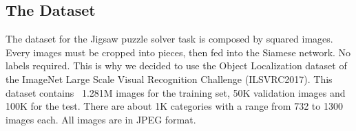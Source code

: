 

\subsection{The Dataset}
The dataset for the Jigsaw puzzle solver task is composed by squared images. Every images must be cropped into pieces, then fed into the Siamese network. No labels required. This is why we decided to use the Object Localization dataset \cite{ILSVRC15} of the ImageNet Large Scale Visual Recognition Challenge (ILSVRC2017). This dataset contains ~1.281M images for the training set, 50K validation images and 100K for the test. There are about 1K categories with a range from 732 to 1300 images each. All images are in JPEG format.

